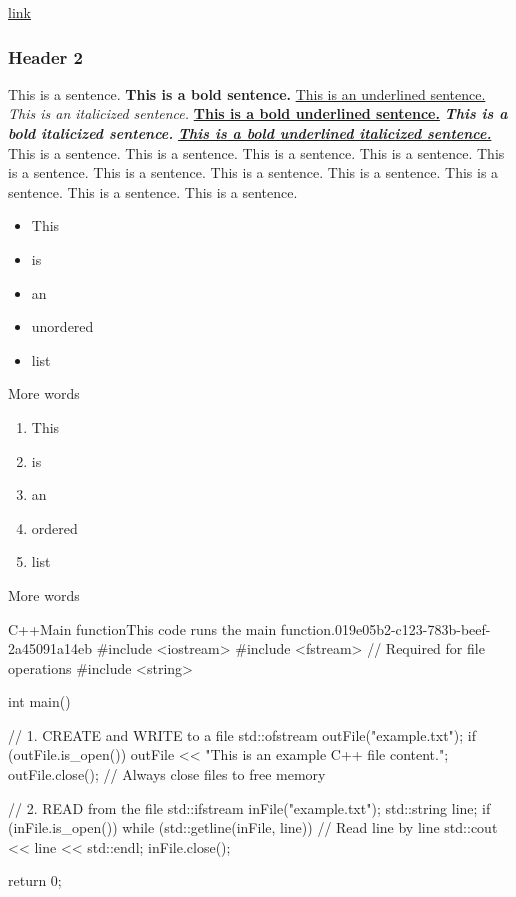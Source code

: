 \underline{\hyperref[019e05b2-c123-754a-9fe0-9b123f16ca77]{link}}

\subsubsection{Header 2}

This is a sentence. \textbf{This is a bold sentence.} \underline{This is an underlined sentence.} \textit{This is an italicized sentence.} \underline{\textbf{This is a bold underlined sentence.}}\textbf{ }\textit{\textbf{This is a bold italicized sentence.}} \underline{\textit{\textbf{This is a bold underlined italicized sentence.}}} This is a sentence. This is a sentence. This is a sentence. This is a sentence. This is a sentence. This is a sentence. This is a sentence. This is a sentence. This is a sentence. This is a sentence. This is a sentence.

\begin{itemize}
  \item This
  \item is
  \item an
  \item unordered
  \item list
\end{itemize}

More words

\begin{enumerate}
  \item This
  \item is
  \item an
  \item ordered
  \item list
\end{enumerate}

More words

\begin{notebookcodeblock}{C++}{Main function}{This code runs the main function.}{019e05b2-c123-783b-beef-2a45091a14eb}
#include <iostream>
#include <fstream> // Required for file operations
#include <string>

int main() {
    // 1. CREATE and WRITE to a file
    std::ofstream outFile("example.txt"); 
    if (outFile.is_open()) {
        outFile << "This is an example C++ file content.\n";
        outFile.close(); // Always close files to free memory
    }

    // 2. READ from the file
    std::ifstream inFile("example.txt");
    std::string line;
    if (inFile.is_open()) {
        while (std::getline(inFile, line)) { // Read line by line
            std::cout << line << std::endl;
        }
        inFile.close();
    }

    return 0;
}
\end{notebookcodeblock}

